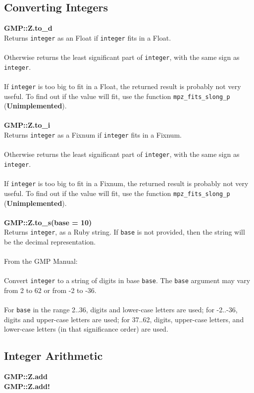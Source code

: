 \documentclass[pdftex,10pt]{article}
\begin{document}
\subsection{Converting Integers}

\large{\textbf{GMP::Z.to\_d}}\\
Returns \texttt{integer} as an Float if \texttt{integer} fits in a Float.\\
\\
Otherwise returns the least significant part of \texttt{integer}, with the same sign as
\texttt{integer}.\\
\\
If \texttt{integer} is too big to fit in a Float, the returned result is probably not
very useful. To find out if the value will fit, use the function
\texttt{mpz\_fits\_slong\_p} (\textbf{Unimplemented}).\\
\\
\large{\textbf{GMP::Z.to\_i}}\\
Returns \texttt{integer} as a Fixnum if \texttt{integer} fits in a Fixnum.\\
\\
Otherwise returns the least significant part of \texttt{integer}, with the same sign as
\texttt{integer}.\\
\\
If \texttt{integer} is too big to fit in a Fixnum, the returned result is probably not
very useful. To find out if the value will fit, use the function
\texttt{mpz\_fits\_slong\_p} (\textbf{Unimplemented}).\\
\\
\large{\textbf{GMP::Z.to\_s(base = 10)}}\\
Returns \texttt{integer}, as a Ruby string. If \texttt{base} is not provided, then the
string will be the decimal representation.\\
\\
From the GMP Manual:\\
\\
Convert \texttt{integer} to a string of digits in base \texttt{base}. The \texttt{base}
argument may vary from 2 to 62 or from -2 to -36.\\
\\
For \texttt{base} in the range 2..36, digits and lower-case letters are used; for
-2..-36, digits and upper-case letters are used; for 37..62, digits, upper-case letters,
and lower-case letters (in that significance order) are used.\\

\subsection{Integer Arithmetic}

\large{\textbf{GMP::Z.add}}\\
\large{\textbf{GMP::Z.add!}}\\
\end{document}
